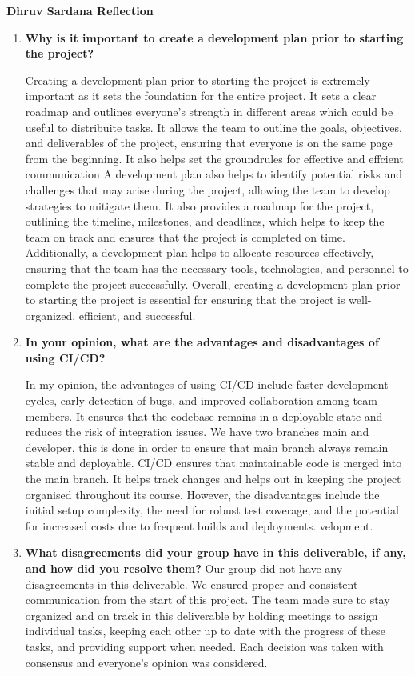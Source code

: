 \documentclass{article}
\begin{document}
\textbf{Dhruv Sardana Reflection}
\begin{enumerate}
    \item  \textbf{Why is it important to create a development plan prior to starting the project?} \newline

    Creating a development plan prior to starting the project is extremely important as it sets the foundation for the entire project. It sets a clear roadmap and outlines everyone's strength in different areas which could be useful to distribuite tasks.
    It allows the team to outline the goals, objectives, and deliverables of the project, ensuring that everyone is on the same page from the beginning. It also helps set the groundrules for effective and effcient communication
    A development plan also helps to identify potential risks and challenges that may arise during the project, allowing the team to develop strategies to mitigate them. 
    It also provides a roadmap for the project, outlining the timeline, milestones, and deadlines, which helps to keep the team on track and ensures that the project is completed on time.
    Additionally, a development plan helps to allocate resources effectively, ensuring that the team has the necessary tools, technologies, and personnel to complete the project successfully. 
    Overall, creating a development plan prior to starting the project is essential for ensuring that the project is well-organized, efficient, and successful.

    
    \item \textbf{In your opinion, what are the advantages and disadvantages of using CI/CD?} \newline

    In my opinion, the advantages of using CI/CD include faster development cycles, early detection of bugs, and improved collaboration among team members. It ensures that the codebase remains in a deployable state and reduces the risk of integration issues.
    We have two branches main and developer, this is done in order to ensure that main branch always remain stable and deployable. CI/CD ensures that maintainable code is merged into the main branch. It helps track changes and helps out in keeping the project organised throughout its course.
    However, the disadvantages include the initial setup complexity, the need for robust test coverage, and the potential for increased costs due to frequent builds and deployments.
  velopment.

    \item \textbf{What disagreements did your group have in this deliverable, if any, and how did you resolve them?}\newline
    Our group did not have any disagreements in this deliverable. We ensured proper and consistent communication from the start of this project. The team made sure to stay organized and on track in this deliverable
    by holding meetings to assign individual tasks, keeping each other up to date with the progress of these tasks, and providing support when needed. Each decision was taken with consensus and everyone's opinion was considered.
\end{enumerate}
\end{document}
